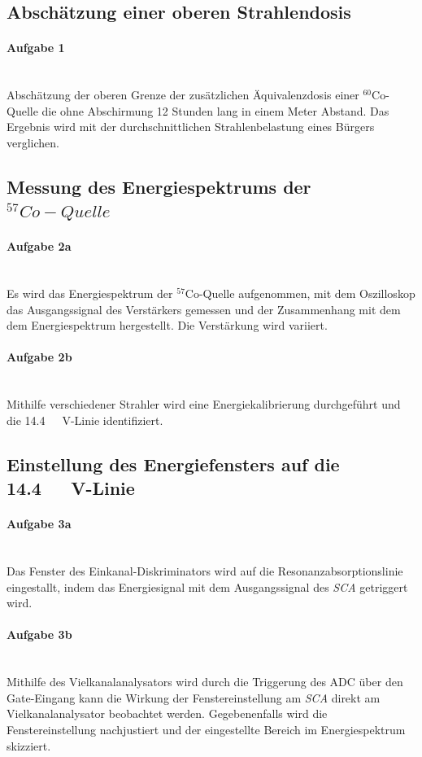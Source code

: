 \documentclass[a4paper,twoside,final]{article}
\begin{document}
\subsection{Abschätzung einer oberen Strahlendosis}
\paragraph{Aufgabe 1}$~$\\
Abschätzung der oberen Grenze der zusätzlichen Äquivalenzdosis einer $^{60}$Co-Quelle die ohne Abschirmung 12 Stunden lang in einem Meter Abstand. Das Ergebnis wird mit der durchschnittlichen Strahlenbelastung eines Bürgers verglichen.
\subsection{Messung des Energiespektrums der $^{57}Co-Quelle$}

\paragraph{Aufgabe 2a}$~$\\
Es wird das Energiespektrum der $^{57}$Co-Quelle aufgenommen, mit dem Oszilloskop das Ausgangssignal des Verstärkers gemessen und der Zusammenhang mit dem dem Energiespektrum hergestellt. Die Verstärkung wird variiert.
\paragraph{Aufgabe 2b}$~$\\
Mithilfe verschiedener Strahler wird eine Energiekalibrierung durchgeführt und die \SI{14,4}{\kilo{}\volt}-Linie identifiziert.

\subsection{Einstellung des Energiefensters auf die \SI{14,4}{\kilo{}\volt}-Linie}
\paragraph{Aufgabe 3a}$~$\\
Das Fenster des Einkanal-Diskriminators wird auf die Resonanzabsorptionslinie eingestallt, indem das Energiesignal mit dem Ausgangssignal des \textit{SCA} getriggert wird.
\paragraph{Aufgabe 3b}$~$\\
Mithilfe des Vielkanalanalysators wird durch die Triggerung des ADC über den Gate-Eingang kann die Wirkung der Fenstereinstellung am \textit{SCA} direkt am Vielkanalanalysator beobachtet werden. Gegebenenfalls wird die Fenstereinstellung nachjustiert und der eingestellte Bereich im Energiespektrum skizziert.
\end{document}
